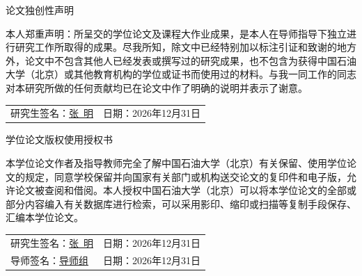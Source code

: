 \documentclass[UTF8,a4paper,zihao=-4,openany,twoside]{ctexbook}
\begin{document}
\cleardoublepage

\thispagestyle{empty}
\begin{center}
    {\heiti 论文独创性声明}
\end{center}
\vspace{4mm}
本人郑重声明：所呈交的学位论文及课程大作业成果，是本人在导师指导下独立进行研究工作所取得的成果。尽我所知，除文中已经特别加以标注引证和致谢的地方外，论文中不包含其他人已经发表或撰写过的研究成果，也不包含为获得中国石油大学（北京）或其他教育机构的学位或证书而使用过的材料。与我一同工作的同志对本研究所做的任何贡献均已在论文中作了明确的说明并表示了谢意。

\vspace{6mm}
\begin{flushright}
    \begin{tabular}{ll}
        研究生签名：\underline{\quad 张~明\quad} & 日期：2026年12月31日 \\
    \end{tabular}
\end{flushright}

\vspace{15mm}

\begin{center}
    {\heiti 学位论文版权使用授权书}
\end{center}
\vspace{4mm}
本学位论文作者及指导教师完全了解中国石油大学（北京）有关保留、使用学位论文的规定，同意学校保留并向国家有关部门或机构送交论文的复印件和电子版，允许论文被查阅和借阅。本人授权中国石油大学（北京）可以将本学位论文的全部或部分内容编入有关数据库进行检索，可以采用影印、缩印或扫描等复制手段保存、汇编本学位论文。

\vspace{6mm}
\begin{flushright}
    \begin{tabular}{ll}
        研究生签名：\underline{\quad 张~明\quad} & 日期：2026年12月31日 \\
        导师签名：\underline{\quad 导师组\quad} & 日期：2026年12月31日 \\
    \end{tabular}
\end{flushright}

\cleardoublepage
\end{document}
